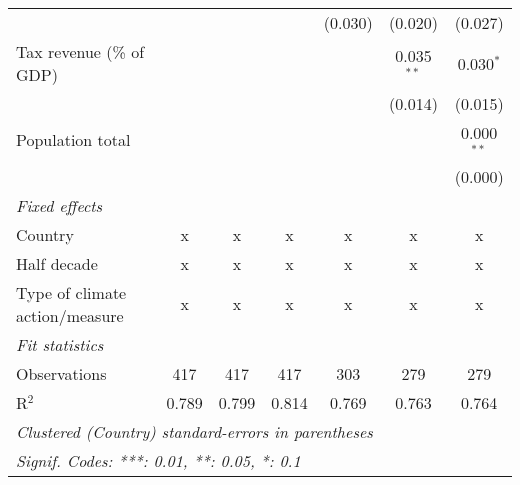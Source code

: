 \begin{tabular}{lcccccc}
                                                     &              &                &                & (0.030)        & (0.020)        & (0.027)\\   
   Tax revenue (\% of GDP)                           &              &                &                &                & 0.035$^{**}$   & 0.030$^{*}$\\   
                                                     &              &                &                &                & (0.014)        & (0.015)\\   
   Population total                                  &              &                &                &                &                & 0.000$^{**}$\\   
                                                     &              &                &                &                &                & (0.000)\\   
   \emph{Fixed effects}\\
   Country                                           & x            & x              & x              & x              & x              & x\\  
   Half decade                                       & x            & x              & x              & x              & x              & x\\  
   Type of climate action/measure                    & x            & x              & x              & x              & x              & x\\  
   \midrule \emph{Fit statistics}\\
   Observations                                      & 417          & 417            & 417            & 303            & 279            & 279\\  
   R$^2$                                             & 0.789        & 0.799          & 0.814          & 0.769          & 0.763          & 0.764\\  
   \midrule
   \multicolumn{7}{l}{\emph{Clustered (Country) standard-errors in parentheses}}\\
   \multicolumn{7}{l}{\emph{Signif. Codes: ***: 0.01, **: 0.05, *: 0.1}}\\
\end{tabular}
\par\endgroup


